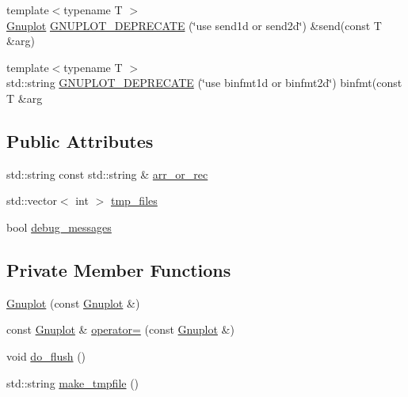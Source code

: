 \begin{DoxyCompactItemize}
\item 
{\footnotesize template$<$typename T $>$ }\\\hyperlink{classgnuplotio_1_1_gnuplot}{Gnuplot} \hyperlink{classgnuplotio_1_1_gnuplot_a4e730c762706c7235eb105bcb56ad185}{G\+N\+U\+P\+L\+O\+T\+\_\+\+D\+E\+P\+R\+E\+C\+A\+TE} (\char`\"{}use send1d or send2d\char`\"{}) \&send(const T \&arg)
\item 
{\footnotesize template$<$typename T $>$ }\\std\+::string \hyperlink{classgnuplotio_1_1_gnuplot_aeb3ba94ed04ecd46b55f89591ba23e7c}{G\+N\+U\+P\+L\+O\+T\+\_\+\+D\+E\+P\+R\+E\+C\+A\+TE} (\char`\"{}use binfmt1d or binfmt2d\char`\"{}) binfmt(const T \&arg
\end{DoxyCompactItemize}
\subsection*{Public Attributes}
\begin{DoxyCompactItemize}
\item 
std\+::string const std\+::string \& \hyperlink{classgnuplotio_1_1_gnuplot_a2d194dbd4d2f3475ff6f9b8384e62a9f}{arr\+\_\+or\+\_\+rec}
\item 
std\+::vector$<$ int $>$ \hyperlink{classgnuplotio_1_1_gnuplot_a92a4f6322e486de17db4507a5fc77348}{tmp\+\_\+files}
\item 
bool \hyperlink{classgnuplotio_1_1_gnuplot_a63e08bfd0cd02937d895ecfb6180107c}{debug\+\_\+messages}
\end{DoxyCompactItemize}
\subsection*{Private Member Functions}
\begin{DoxyCompactItemize}
\item 
\hyperlink{classgnuplotio_1_1_gnuplot_a8c3ce0fa11d7fecc56b29eaaa01f89d2}{Gnuplot} (const \hyperlink{classgnuplotio_1_1_gnuplot}{Gnuplot} \&)
\item 
const \hyperlink{classgnuplotio_1_1_gnuplot}{Gnuplot} \& \hyperlink{classgnuplotio_1_1_gnuplot_a30c2b5fce8b13661324144045f968831}{operator=} (const \hyperlink{classgnuplotio_1_1_gnuplot}{Gnuplot} \&)
\item 
void \hyperlink{classgnuplotio_1_1_gnuplot_a0fe1681b2ae4a372b683de488e340faa}{do\+\_\+flush} ()
\item 
std\+::string \hyperlink{classgnuplotio_1_1_gnuplot_a4f09df1bc60e8f26bb2c8500ad34da8e}{make\+\_\+tmpfile} ()
\end{DoxyCompactItemize}
